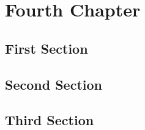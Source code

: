\chapter{Fourth Chapter}
\minitocsection 
\kant
\section{First Section}
\kant
\section{Second Section}
\kant
\section{Third Section}
\kant
